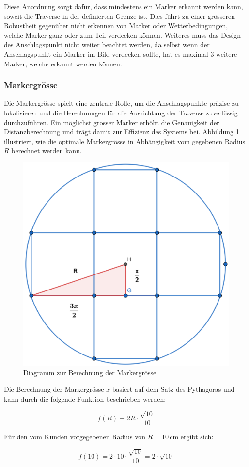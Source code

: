 Diese Anordnung sorgt dafür, dass mindestens ein Marker erkannt werden kann, soweit die Traverse in der definierten Grenze ist. 
Dies führt zu einer grösseren Robustheit gegenüber nicht erkennen von Marker oder Wetterbedingungen, welche Marker ganz oder zum Teil verdecken können.
Weiteres muss das Design des Anschlagspunkt nicht weiter beachtet werden, da selbst wenn der Anschlagspunkt ein Marker im Bild verdecken sollte, hat es maximal 3 weitere Marker, welche erkannt werden können.


\subsubsection{Markergrösse}

Die Markergrösse spielt eine zentrale Rolle, um die Anschlagspunkte präzise zu lokalisieren und 
die Berechnungen für die Ausrichtung der Traverse zuverlässig durchzuführen. Ein möglichst grosser 
Marker erhöht die Genauigkeit der Distanzberechnung und trägt damit zur Effizienz des Systems bei. 
Abbildung \ref{fig:marker} illustriert, wie die optimale Markergrösse in Abhängigkeit vom gegebenen 
Radius \( R \) berechnet werden kann.

\begin{figure}[H]
    \centering
    \includegraphics[width=0.5\linewidth]{graphics/marker.png}
    \caption{Diagramm zur Berechnung der Markergrösse}
    \label{fig:marker}
\end{figure}

Die Berechnung der Markergrösse \( x \) basiert auf dem Satz des Pythagoras und kann durch die folgende Funktion beschrieben werden:

\[
f(R) = 2R \cdot \frac{\sqrt{10}}{10}
\]

Für den vom Kunden vorgegebenen Radius von \( R = 10 \, \mathrm{cm} \) ergibt sich:

\[
f(10) = 2 \cdot 10 \cdot \frac{\sqrt{10}}{10} = 2 \cdot \sqrt{10}
\]

